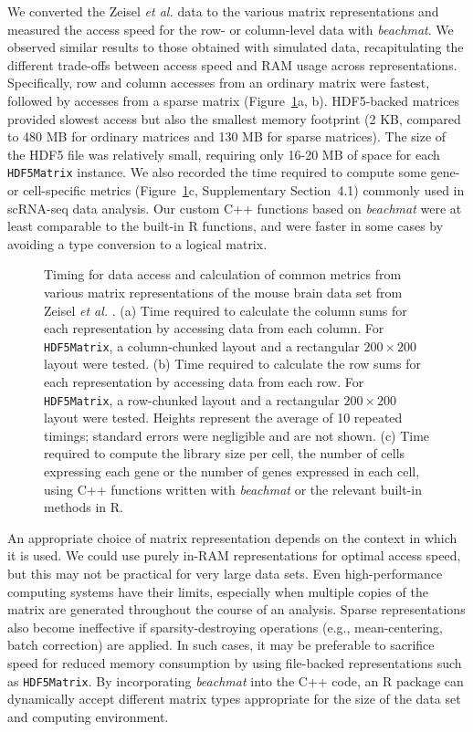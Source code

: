 \documentclass[10pt,letterpaper]{article}
\newcommand{\suppsecrealzeisel}{4.1}
\newcommand{\beachmat}{\textit{beachmat}}
\newcommand{\code}[1]{\texttt{#1}}
\begin{document}
We converted the Zeisel \textit{et al.} data to the various matrix representations and measured the access speed for the row- or column-level data with \beachmat{}.
We observed similar results to those obtained with simulated data, recapitulating the different trade-offs between access speed and RAM usage across representations.
Specifically, row and column accesses from an ordinary matrix were fastest, followed by accesses from a sparse matrix (Figure~\ref{fig:zeisel}a, b).
HDF5-backed matrices provided slowest access but also the smallest memory footprint (2 KB, compared to 480 MB for ordinary matrices and 130 MB for sparse matrices).
The size of the HDF5 file was relatively small, requiring only 16-20 MB of space for each \code{HDF5Matrix} instance.
We also recorded the time required to compute some gene- or cell-specific metrics (Figure~\ref{fig:zeisel}c, Supplementary Section~\suppsecrealzeisel{}) commonly used in scRNA-seq data analysis.
Our custom C++ functions based on \beachmat{} were at least comparable to the built-in R functions, and were faster in some cases by avoiding a type conversion to a logical matrix.

\begin{figure}[b]
    \caption{Timing for data access and calculation of common metrics from various matrix representations of the mouse brain data set from Zeisel \textit{et al.} \cite{zeisel2015brain}.
(a) Time required to calculate the column sums for each representation by accessing data from each column.
For \code{HDF5Matrix}, a column-chunked layout and a rectangular $200 \times 200$ layout were tested.
(b) Time required to calculate the row sums for each representation by accessing data from each row.
For \code{HDF5Matrix}, a row-chunked layout and a rectangular $200 \times 200$ layout were tested.
Heights represent the average of 10 repeated timings; standard errors were negligible and are not shown.
(c) Time required to compute the library size per cell, the number of cells expressing each gene or the number of genes expressed in each cell, using C++ functions written with \beachmat{} or the relevant built-in methods in R.}
    \label{fig:zeisel}
\end{figure}

An appropriate choice of matrix representation depends on the context in which it is used.
We could use purely in-RAM representations for optimal access speed, but this may not be practical for very large data sets.
Even high-performance computing systems have their limits, especially when multiple copies of the matrix are generated throughout the course of an analysis.
Sparse representations also become ineffective if sparsity-destroying operations (e.g., mean-centering, batch correction) are applied.
In such cases, it may be preferable to sacrifice speed for reduced memory consumption by using file-backed representations such as \code{HDF5Matrix}.
By incorporating \beachmat{} into the C++ code, an R package can dynamically accept different matrix types appropriate for the size of the data set and computing environment.
\end{document}
